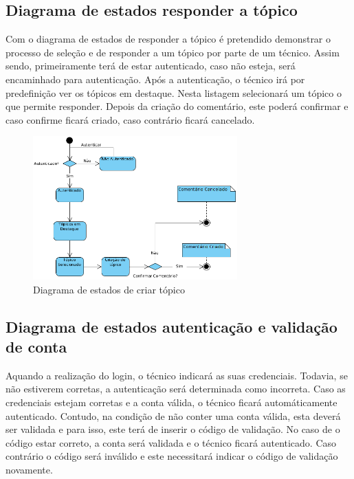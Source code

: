 \newpage

\subsection{Diagrama de estados responder a tópico}

Com o diagrama de estados de responder a tópico é pretendido demonstrar o processo de seleção e de responder a um tópico por parte de um técnico. Assim sendo, primeiramente terá de estar autenticado, caso não esteja, será encaminhado para autenticação. Após a autenticação, o técnico irá por predefinição ver os tópicos em destaque. Nesta listagem selecionará um tópico o que permite responder. Depois da criação do comentário, este poderá confirmar e caso confirme ficará criado, caso contrário ficará cancelado.

\begin{figure}[htb]
  \centering
  \includegraphics[width=0.7\textwidth]{images/diagramas/estados/responder_topico_tecnico.png}
  \caption{Diagrama de estados de criar tópico}
  \label{fig:41}
\end{figure}

\newpage

\subsection{Diagrama de estados autenticação e validação de conta}

Aquando a realização do login, o técnico indicará as suas credenciais. Todavia, se não estiverem corretas, a autenticação será determinada como incorreta. Caso as credenciais estejam corretas e a conta válida, o técnico ficará automáticamente autenticado. Contudo, na condição de não conter uma conta válida, esta deverá ser validada e para isso, este terá de inserir o código de validação. No caso de o código estar correto, a conta será validada e o técnico ficará autenticado. Caso contrário o código será inválido e este necessitará indicar o código de validação novamente.


